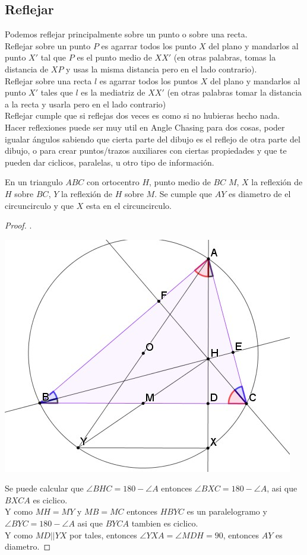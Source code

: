 \documentclass[11pt]{scrartcl}
\begin{document}
\subsection{Reflejar}
    Podemos reflejar principalmente sobre un punto o sobre una recta. \\
    Reflejar sobre un punto $P$ es agarrar todos los punto $X$ del plano y mandarlos al punto $X'$ tal que $P$ es el punto medio de $XX'$ (en otras palabras, tomas la distancia de $XP$ y usas la misma distancia pero en el lado contrario). \\
    Reflejar sobre una recta $l$ es agarrar todos los puntos $X$ del plano y mandarlos al punto $X'$ tales que $l$ es la mediatriz de $XX'$ (en otras palabras tomar la distancia a la recta y usarla pero en el lado contrario) \\
    Reflejar cumple que si reflejas dos veces es como si no hubieras hecho nada. \\
    Hacer reflexiones puede ser muy util en Angle Chasing para dos cosas, poder igualar \'angulos sabiendo que cierta parte del dibujo es el reflejo de otra parte del dibujo, o para crear puntos/trazos auxiliares con ciertas propiedades y que te pueden dar ciclicos, paralelas, u otro tipo de informaci\'on.  \\
    \begin{theorem}
    En un triangulo $ABC$ con ortocentro $H$, punto medio de $BC$ $M$, $X$ la reflexi\'on de $H$ sobre $BC$, $Y$ la reflexi\'on de $H$ sobre $M$. Se cumple que 
    $AY$ es diametro de el circuncirculo y que $X$ esta en el circuncirculo.
    \end{theorem}
    \begin{proof}
        .
        \begin{center}
         \includegraphics[scale=0.5]{AC7.jpg}
        \end{center}
        Se puede calcular que $\angle BHC=180-\angle A$ entonces $\angle BXC=180-\angle A$, asi que $BXCA$ es ciclico. \\
        Y como $MH=MY$ y $MB=MC$ entonces $HBYC$ es un paralelogramo y $\angle BYC=180-\angle A$ asi que $BYCA$ tambien es ciclico. \\
        Y como $MD || YX$ por tales, entonces $\angle YXA=\angle MDH=90$, entonces $AY$ es diametro.
    \end{proof}
\end{document}
